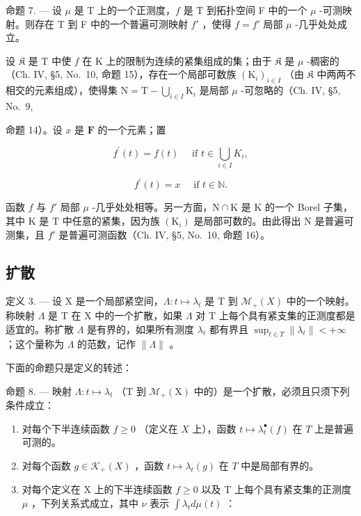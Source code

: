 命题 7. --- 设 \(\mu\) 是 T 上的一个正测度，\(f\) 是 T 到拓扑空间 F 中的一个 \(\mu\) -可测映射。则存在 T 到 F 中的一个普遍可测映射 \(f'\) ，使得 \(f = f'\) 局部 \(\mu\) -几乎处处成立。

设 \(\mathfrak{K}\) 是 T 中使 \(f\) 在 K 上的限制为连续的紧集组成的集；由于 \(\mathfrak{K}\) 是 \(\mu\) -稠密的（Ch. IV, §5, No.~10, 命题 15），存在一个局部可数族 \((\mathrm{K}_i)_{i\in I}\) （由 \(\mathfrak{K}\) 中两两不相交的元素组成），使得集 \(\mathrm{N} = \mathrm{T} - \bigcup_{i\in I}\mathrm{K}_i\) 是局部 \(\mu\) -可忽略的（Ch. IV, §5, No.~9,

命题 14）。设 \(x\) 是 \(\mathbf{F}\) 的一个元素；置

\[
f ^ {\prime} (t) = f (t) \quad \text { if } t \in \bigcup_ {i \in I} K _ {i},
\]

\[
f ^ {\prime} (t) = x \quad \text { if } t \in \mathbb {N}.
\]

函数 \(f\) 与 \(f'\) 局部 \(\mu\) -几乎处处相等。另一方面，\(\mathrm{N} \cap \mathrm{K}\) 是 \(\mathrm{K}\) 的一个 Borel 子集，其中 \(\mathrm{K}\) 是 \(\mathrm{T}\) 中任意的紧集，因为族 \((\mathrm{K}_i)\) 是局部可数的。由此得出 \(\mathrm{N}\) 是普遍可测集，且 \(f'\) 是普遍可测函数（Ch. IV, §5, No.~10, 命题 16）。

\subsection{扩散}

定义 3. --- 设 X 是一个局部紧空间，\(\Lambda : t \mapsto \lambda_t\) 是 T 到 \(\mathcal{M}_{+}(X)\) 中的一个映射。称映射 \(\Lambda\) 是 T 在 X 中的一个扩散，如果 \(\Lambda\) 对 T 上每个具有紧支集的正测度都是适宜的。称扩散 \(\Lambda\) 是有界的，如果所有测度 \(\lambda_{t}\) 都有界且 \(\sup_{t\in T}\|\lambda_{t}\|<+\infty\) ；这个量称为 \(\Lambda\) 的范数，记作 \(\|\Lambda\|\) 。

下面的命题只是定义的转述：

命题 8. --- 映射 \(\Lambda: t \mapsto \lambda_t\) （T 到 \(\mathcal{M}_+(\mathrm{X})\) 中的）是一个扩散，必须且只须下列条件成立：

\begin{enumerate}
\def\labelenumi{\arabic{enumi})}
\item
  对每个下半连续函数 \(f \geqslant 0\) （定义在 \(X\) 上），函数 \(t \mapsto \lambda_t^\bullet(f)\) 在 \(T\) 上是普遍可测的。
\item
  对每个函数 \(g \in \mathcal{K}_{+}(X)\) ，函数 \(t \mapsto \lambda_t(g)\) 在 \(T\) 中是局部有界的。
\item
  对每个定义在 X 上的下半连续函数 \(f \geqslant 0\) 以及 T 上每个具有紧支集的正测度 \(\mu\) ，下列关系式成立，其中 \(\nu\) 表示 \(\int \lambda_{t} d\mu(t)\) ：
\end{enumerate}

